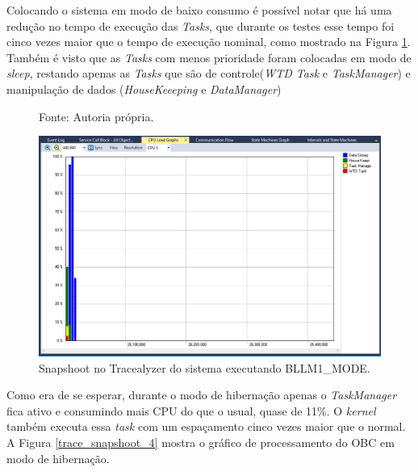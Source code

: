 Colocando o sistema em modo de baixo consumo é possível notar que há uma redução no tempo de execução das \textit{Tasks}, que durante os testes esse tempo foi cinco vezes maior que o tempo de execução nominal, como mostrado na Figura \ref{trace_snapshoot_5}. Também é visto que as \textit{Tasks} com menos prioridade foram colocadas em modo de \textit{sleep}, restando apenas as \textit{Tasks} que são de controle(\textit{WTD Task} e \textit{TaskManager}) e manipulação de dados (\textit{HouseKeeeping} e \textit{DataManager})

\begin{figure}[h]
\footnotesize{	
	\centering
			\centering
	\footnotesize{Fonte: Autoria própria.}
	
	\includegraphics[keepaspectratio=true,scale=0.43]{figuras/trace_snapshoot_5.PNG}
	\caption{Snapshoot no Tracealyzer do sistema executando BLLM1\_MODE.}
	\label{trace_snapshoot_5}
}
\end{figure}
\FloatBarrier

Como era de se esperar, durante o modo de hibernação apenas o \textit{TaskManager} fica ativo e consumindo mais CPU do que o usual, quase de 11\%. O \textit{kernel} também executa essa \textit{task} com um espaçamento cinco vezes maior que o normal. A Figura \ref{trace_snapshoot_4} mostra o gráfico de processamento do OBC em modo de hibernação.


